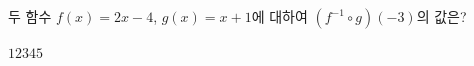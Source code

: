 \hspace*{2mm}\begin{minipage}[t]{\dimexpr\linewidth-2mm\relax}\vspace{0pt}
두 함수 $f(x)=2x-4$, $g(x)=x+1$에 대하여 $(f^{-1}\circ g)(-3)$의 값은?
\begin{choices32}{$1$}{$2$}{$3$}{$4$}{$5$}\end{choices32}\end{minipage}
